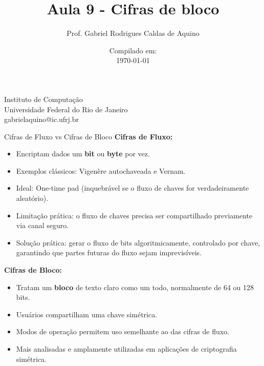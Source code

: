 \title{Aula 9 - Cifras de bloco}

\author{Prof. Gabriel Rodrigues Caldas de Aquino}

\institute
{
    Instituto de Computação \\
    Universidade Federal do Rio de Janeiro\\
    gabrielaquino@ic.ufrj.br%
}
\date{Compilado em: \\ \today} %




\begin{frame}
    \titlepage
\end{frame}

\begin{frame}{Cifras de Fluxo vs Cifras de Bloco}
\textbf{Cifras de Fluxo:}
\begin{itemize}
    \item Encriptam dados um \textbf{bit} ou \textbf{byte} por vez.
    \item Exemplos clássicos: Vigenère autochaveada e Vernam.
    \item Ideal: One-time pad (inquebrável se o fluxo de chaves for verdadeiramente aleatório).
    \item Limitação prática: o fluxo de chaves precisa ser compartilhado previamente via canal seguro.
    \item Solução prática: gerar o fluxo de bits algoritmicamente, controlado por chave, garantindo que partes futuras do fluxo sejam imprevisíveis.
\end{itemize}

\medskip
\textbf{Cifras de Bloco:}
\begin{itemize}
    \item Tratam um \textbf{bloco} de texto claro como um todo, normalmente de 64 ou 128 bits.
    \item Usuários compartilham uma chave simétrica.
    \item Modos de operação permitem uso semelhante ao das cifras de fluxo.
    \item Mais analisadas e amplamente utilizadas em aplicações de criptografia simétrica.
\end{itemize}
\end{frame}

